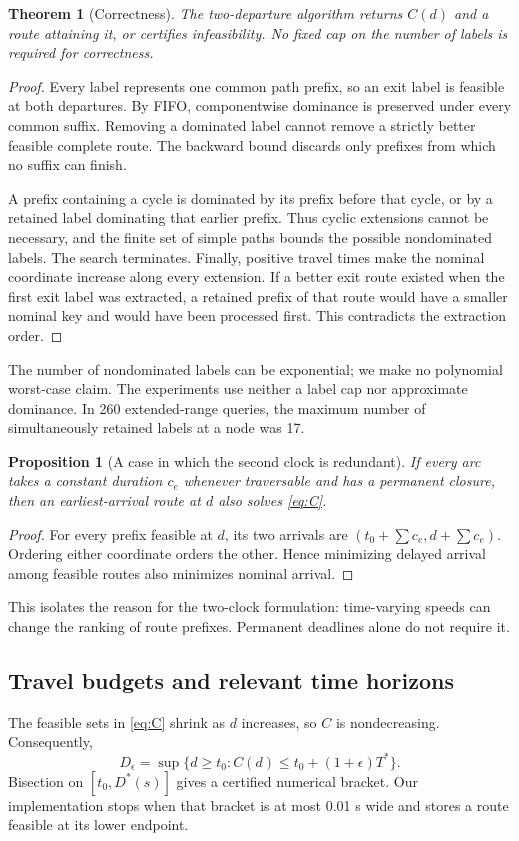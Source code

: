 \documentclass[11pt]{article}
\newtheorem{proposition}{Proposition}
\newtheorem{theorem}{Theorem}
\begin{document}
\begin{theorem}[Correctness]
\label{thm:algorithm}
The two-departure algorithm returns $C(d)$ and a route attaining it, or certifies infeasibility. No fixed cap on the number of labels is required for correctness.
\end{theorem}
\begin{proof}
Every label represents one common path prefix, so an exit label is feasible at both departures. By FIFO, componentwise dominance is preserved under every common suffix. Removing a dominated label cannot remove a strictly better feasible complete route. The backward bound discards only prefixes from which no suffix can finish.

A prefix containing a cycle is dominated by its prefix before that cycle, or by a retained label dominating that earlier prefix. Thus cyclic extensions cannot be necessary, and the finite set of simple paths bounds the possible nondominated labels. The search terminates. Finally, positive travel times make the nominal coordinate increase along every extension. If a better exit route existed when the first exit label was extracted, a retained prefix of that route would have a smaller nominal key and would have been processed first. This contradicts the extraction order.
\end{proof}
The number of nondominated labels can be exponential; we make no polynomial worst-case claim. The experiments use neither a label cap nor approximate dominance. In 260 extended-range queries, the maximum number of simultaneously retained labels at a node was 17.

\begin{proposition}[A case in which the second clock is redundant]
If every arc takes a constant duration $c_e$ whenever traversable and has a permanent closure, then an earliest-arrival route at $d$ also solves \eqref{eq:C}.
\end{proposition}
\begin{proof}
For every prefix feasible at $d$, its two arrivals are
$(t_0+\sum c_e,d+\sum c_e)$. Ordering either coordinate orders the other. Hence minimizing delayed arrival among feasible routes also minimizes nominal arrival.
\end{proof}
This isolates the reason for the two-clock formulation: time-varying speeds can change the ranking of route prefixes. Permanent deadlines alone do not require it.

\subsection{Travel budgets and relevant time horizons}
The feasible sets in \eqref{eq:C} shrink as $d$ increases, so $C$ is nondecreasing. Consequently,
\begin{equation}
 D_\epsilon=\sup\{d\ge t_0:C(d)\le t_0+(1+\epsilon)T^*\}.
\end{equation}
Bisection on $[t_0,D^*(s)]$ gives a certified numerical bracket. Our implementation stops when that bracket is at most 0.01 s wide and stores a route feasible at its lower endpoint.
\end{document}
